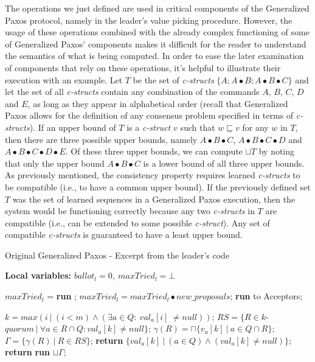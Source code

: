 {\color{red} The operations we just defined are used in critical components of the Generalized Paxos protocol, namely in the leader's value picking procedure. However, the usage of these operations combined with the already complex functioning of some of Generalized Paxos' components makes it difficult for the reader to understand the semantics of what is being computed. In order to ease the later examination of components that rely on these operations, it's helpful to illustrate their execution with an example. Let $T$ be the set of \textit{c-structs} $\{A ; A \bullet B ; A \bullet B \bullet C\}$ and let the set of all \textit{c-structs} contain any combination of the commands $A$, $B$, $C$, $D$ and $E$, as long as they appear in alphabetical order (recall that Generalized Paxos allows for the definition of any consensus problem specified in terms of \textit{c-structs}).} If an upper bound of $T$ is a \textit{c-struct} $v$ such that $w \sqsubseteq v$ for any $w$ in $T$, then there are three possible upper bounds, namely $A \bullet B \bullet C$, $A \bullet B \bullet C \bullet D$ and $A \bullet B \bullet C \bullet D \bullet E$. Of these three upper bounds, we can compute $\sqcup T$ by noting that only the upper bound $A \bullet B \bullet C$ is a lower bound of all three upper bounds. {\color{red}As previously mentioned, the consistency property requires learned \textit{c-structs} to be compatible (i.e., to have a common upper bound). If the previously defined set $T$ was the set of learned sequences in a Generalized Paxos execution, then the system would be functioning correctly because any two \textit{c-structs} in $T$ are compatible (i.e., can be extended to some possible \textit{c-struct}). Any set of compatible \textit{c-structs} is guaranteed to have a least upper bound.}\par 
\begin{algorithm}
	\caption{Original Generalized Paxos - Excerpt from the leader's code}
	\label{leader_excerpt}
	\textbf{Local variables:} $ballot_l = 0,\ maxTried_l = \bot$
	\begin{algorithmic}[1]
		\State $maxTried_l$ = \textbf{run} ;
		\State $maxTried_l = maxTried_l \bullet new\_proposals$;
		\State \textbf{run}  to Acceptors;
		\EndFunction
		
		\State
		\State $k = max(i\ |\ (i < m) \wedge (\exists a \in Q :\ val_a[i]\ \neq null))$;
		\State $RS = \{R \in k$-$quorum\ |\ \forall a \in R \cap Q : val_a[k] \neq null\}$;
		\State $\gamma(R) = \sqcap \{v_a[k]\ |\ a \in Q \cap R \}$;
		\State $\Gamma = \{\gamma(R)\ |\ R \in RS \}$;
		\State
		\State \textbf{return} $\{val_a[k]\ |\ (a \in Q) \wedge (val_a[k] \neq null)\}$;
		\Else
		\State \textbf{return} \textbf{run} $\sqcup \Gamma$;
		\EndIf
		\EndFunction
		
	\end{algorithmic}
\end{algorithm}

